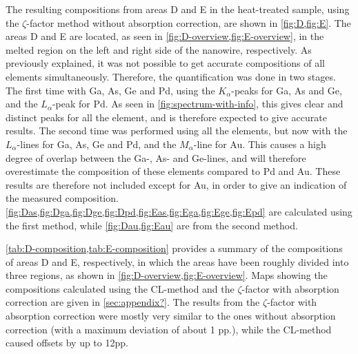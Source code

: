 The resulting compositions from areas D and E in the heat-treated sample, using the $\zeta$-factor method without absorption correction, are shown in \cref{fig:D,fig:E}. The areas D and E are located, as seen in \cref{fig:D-overview,fig:E-overview}, in the melted region on the left and right side of the nanowire, respectively. As previously explained, it was not possible to get accurate compositions of all elements simultaneously. Therefore, the quantification was done in two stages. The first time with Ga, As, Ge and Pd, using the $K_\alpha$-peaks for Ga, As and Ge, and the $L_\alpha$-peak for Pd. As seen in \cref{fig:spectrum-with-info}, this gives clear and distinct peaks for all the element, and is therefore expected to give accurate results. The second time was performed using all the elements, but now with the $L_\alpha$-lines for Ga, As, Ge and Pd, and the $M_\alpha$-line for Au. This causes a high degree of overlap between the Ga-, As- and Ge-lines, and will therefore overestimate the composition of these elements compared to Pd and Au. These results are therefore not included except for Au, in order to give an indication of the measured composition. \cref{fig:Das,fig:Dga,fig:Dge,fig:Dpd,fig:Eas,fig:Ega,fig:Ege,fig:Epd} are calculated using the first method, while \cref{fig:Dau,fig:Eau} are from the second method.

\cref{tab:D-composition,tab:E-composition} provides a summary of the compositions of areas D and E, respectively, in which the areas have been roughly divided into three regions, as shown in \cref{fig:D-overview,fig:E-overview}. Maps showing the compositions calculated using the CL-method and the $\zeta$-factor with absorption correction are given in \ref{sec:appendix?}. The results from the $\zeta$-factor with absorption correction were mostly very similar to the ones without absorption correction (with a maximum deviation of about 1 pp.), while the CL-method caused offsets by up to 12pp. 


